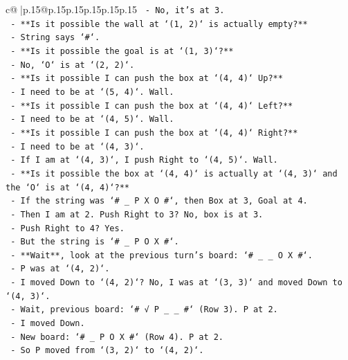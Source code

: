 \documentclass{article}
\begin{document}
{\begin{supertabular}{c@{$\;$}|p{.15\linewidth}@{}p{.15\linewidth}p{.15\linewidth}p{.15\linewidth}p{.15\linewidth}p{.15\linewidth}}
{{{\texttt{            {-} No, it's at 3.} \\
\texttt{          {-} **Is it possible the wall at `(1, 2)` is actually empty?**} \\
\texttt{            {-} String says `\#`.} \\
\texttt{          {-} **Is it possible the goal is at `(1, 3)`?**} \\
\texttt{            {-} No, `O` is at `(2, 2)`.} \\
\texttt{          {-} **Is it possible I can push the box at `(4, 4)` Up?**} \\
\texttt{            {-} I need to be at `(5, 4)`. Wall.} \\
\texttt{          {-} **Is it possible I can push the box at `(4, 4)` Left?**} \\
\texttt{            {-} I need to be at `(4, 5)`. Wall.} \\
\texttt{          {-} **Is it possible I can push the box at `(4, 4)` Right?**} \\
\texttt{            {-} I need to be at `(4, 3)`.} \\
\texttt{            {-} If I am at `(4, 3)`, I push Right to `(4, 5)`. Wall.} \\
\texttt{          {-} **Is it possible the box at `(4, 4)` is actually at `(4, 3)` and the `O` is at `(4, 4)`?**} \\
\texttt{            {-} If the string was `\# \_ P X O \#`, then Box at 3, Goal at 4.} \\
\texttt{            {-} Then I am at 2. Push Right to 3? No, box is at 3.} \\
\texttt{            {-} Push Right to 4? Yes.} \\
\texttt{            {-} But the string is `\# \_ P O X \#`.} \\
\texttt{          {-} **Wait**, look at the previous turn's board: `\# \_ \_ O X \#`.} \\
\texttt{            {-} P was at `(4, 2)`.} \\
\texttt{            {-} I moved Down to `(4, 2)`? No, I was at `(3, 3)` and moved Down to `(4, 3)`.} \\
\texttt{            {-} Wait, previous board: `\# √ P \_ \_ \#` (Row 3). P at 2.} \\
\texttt{            {-} I moved Down.} \\
\texttt{            {-} New board: `\# \_ P O X \#` (Row 4). P at 2.} \\
\texttt{            {-} So P moved from `(3, 2)` to `(4, 2)`.} \\
}}}
\end{supertabular}}
\end{document}
